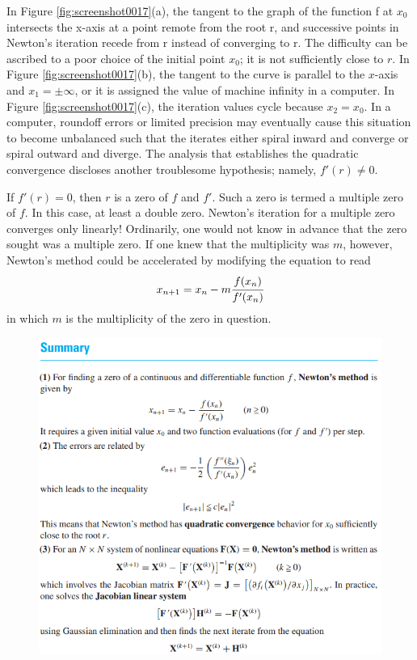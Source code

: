 \documentclass[12pt]{article}
\theoremstyle{theorem}
\begin{document}
In Figure \ref{fig:screenshot0017}(a), the tangent to the graph of the function f at $x_0$ intersects the x-axis at a point remote from the root r, and successive points in Newton’s iteration recede from r instead of converging to r. The difficulty can be ascribed to a poor choice of the initial
point $x_0$; it is not sufficiently close to $r$. In Figure \ref{fig:screenshot0017}(b), the tangent to the curve is parallel to the $x$-axis and $x_1 = \pm \infty$, or it is assigned the value of machine infinity in a computer. In Figure \ref{fig:screenshot0017}(c), the iteration values cycle because $x_2 = x_0$. In a computer, roundoff errors or limited precision may eventually cause this situation to become unbalanced such that the iterates either spiral inward and converge or spiral outward and diverge. The analysis that establishes the quadratic convergence discloses another troublesome hypothesis; namely, $f'(r)\neq 0$. 
%
\begin{shaded}
If $f'(r)=0$, then $r$ is a zero of $f$ and $f'$. Such a zero is termed a multiple zero of $f$. In this case, at least a double zero. Newton’s iteration for a multiple zero converges only linearly! Ordinarily, one would not know in advance that the zero sought was a multiple zero. If one knew that the multiplicity was $m$, however, Newton’s
method could be accelerated by modifying the equation to read 
%
\[ x_{n+1} = x_n - m \cfrac{f(x_n)}{f'(x_n)} \]
%
in which $m$ is the multiplicity of the zero in question. 
\end{shaded}
%
\begin{figure}[h!]
	\centering
	\includegraphics[scale=0.8]{Figures/10}
\end{figure}
\end{document}
